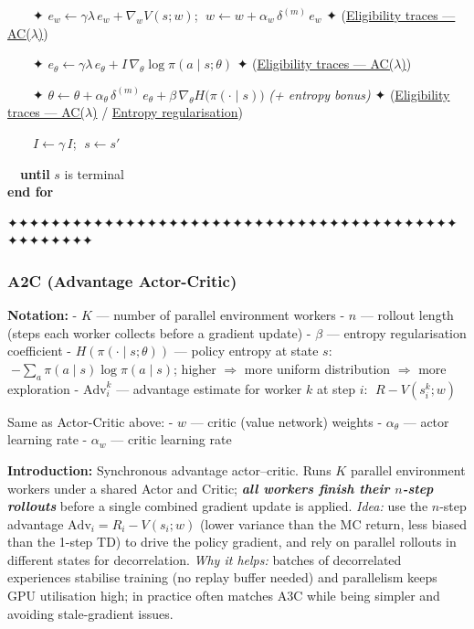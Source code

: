 \documentclass[11pt]{article}
\begin{document}
\begin{pseudobox}
\strut ~~~~✦ \(e_w \leftarrow \gamma\lambda\,e_w + \nabla_w V(s;w)\);
\(\;w \leftarrow w + \alpha_w\,\delta^{(m)}\,e_w\) ✦
(\hyperref[trick-4-2-5]{Eligibility traces --- AC(\(\lambda\))})\\
\strut ~~~~✦
\(e_\theta \leftarrow \gamma\lambda\,e_\theta + I\,\nabla_\theta\log\pi(a\mid s;\theta)\)
✦ (\hyperref[trick-4-2-5]{Eligibility traces --- AC(\(\lambda\))})\\
\strut ~~~~✦
\(\theta \leftarrow \theta + \alpha_\theta\,\delta^{(m)}\,e_\theta + \beta\,\nabla_\theta H\bigl(\pi(\cdot\mid s)\bigr)\)
\emph{(+ entropy bonus)} ✦ (\hyperref[trick-4-2-5]{Eligibility traces
--- AC(\(\lambda\))} / \hyperref[trick-4-2-4]{Entropy regularisation})\\
\strut ~~~~\(I \leftarrow \gamma\, I\); \(\;s \leftarrow s'\)\\
\strut ~~\textbf{until} \(s\) is terminal\\
\textbf{end for}

\end{pseudobox}

    ✦✦✦✦✦✦✦✦✦✦✦✦✦✦✦✦✦✦✦✦✦✦✦✦✦✦✦✦✦✦✦✦✦✦✦✦✦✦✦✦✦✦✦✦✦✦✦✦✦✦

    \clearpage

\label{a2c}

    \subsubsection{A2C (Advantage
Actor-Critic)}\label{a2c-advantage-actor-critic}

    \textbf{Notation:} - \(K\) --- number of parallel environment workers -
\(n\) --- rollout length (steps each worker collects before a gradient
update) - \(\beta\) --- entropy regularisation coefficient -
\(H(\pi(\cdot \mid s;\theta))\) --- policy entropy at state \(s\):
\(\;{-\sum_a \pi(a \mid s)\log\pi(a \mid s)}\); higher \(\Rightarrow\)
more uniform distribution \(\Rightarrow\) more exploration -
\(\mathrm{Adv}_i^k\) --- advantage estimate for worker \(k\) at step
\(i\): \(\;R - V(s_i^k;w)\)

Same as Actor-Critic above: - \(w\) --- critic (value network) weights -
\(\alpha_\theta\) --- actor learning rate - \(\alpha_w\) --- critic
learning rate

    \label{intro-4-3}

    \textbf{Introduction:} Synchronous advantage actor--critic. Runs \(K\)
parallel environment workers under a shared Actor and Critic;
\textbf{\emph{all workers finish their \(n\)-step rollouts}} before a
single combined gradient update is applied. \emph{Idea:} use the
\(n\)-step advantage \(\mathrm{Adv}_i = R_i - V(s_i;w)\) (lower variance
than the MC return, less biased than the 1-step TD) to drive the policy
gradient, and rely on parallel rollouts in different states for
decorrelation. \emph{Why it helps:} batches of decorrelated experiences
stabilise training (no replay buffer needed) and parallelism keeps GPU
utilisation high; in practice often matches A3C while being simpler and
avoiding stale-gradient issues.
\end{document}
